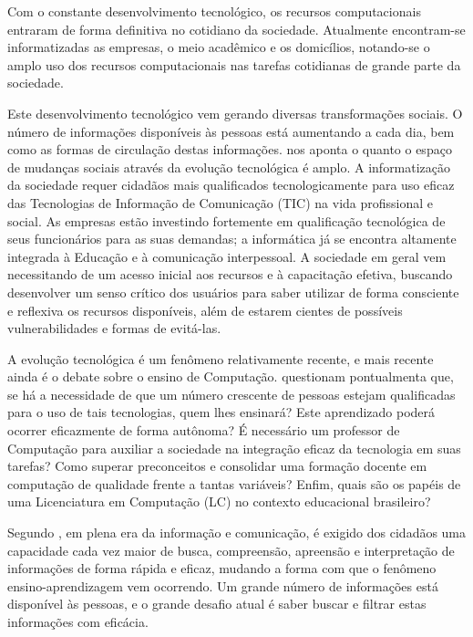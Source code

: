 

Com o constante desenvolvimento tecnológico, os recursos computacionais entraram de forma definitiva no cotidiano da sociedade. Atualmente encontram-se informatizadas as empresas, o meio acadêmico e os domicílios, notando-se o amplo uso dos recursos computacionais nas
tarefas cotidianas de grande parte da sociedade. 

Este desenvolvimento tecnológico vem gerando diversas transformações sociais. O número de informações disponíveis às pessoas está aumentando a cada dia, bem como as formas de circulação destas informações. \citep{quim2013} nos aponta o quanto o espaço de mudanças sociais através da evolução tecnológica é amplo. A informatização da sociedade requer cidadãos mais qualificados tecnologicamente para  uso eficaz das Tecnologias de Informação de Comunicação (TIC) na vida profissional e social. As empresas estão investindo fortemente em qualificação tecnológica de seus funcionários para as suas demandas; a informática já se encontra altamente integrada à Educação e à comunicação interpessoal. A sociedade em geral vem necessitando de um acesso inicial aos recursos e à capacitação efetiva, buscando desenvolver um senso crítico dos usuários para saber utilizar de forma consciente e reflexiva os recursos disponíveis, além de estarem cientes de possíveis vulnerabilidades e formas de evitá-las.


A evolução tecnológica é um fenômeno relativamente recente, e mais recente ainda é o debate sobre o ensino de Computação. \citet{castro2013a} questionam pontualmenta que, se há a necessidade de que um número crescente de pessoas estejam qualificadas para o uso de tais tecnologias, quem lhes ensinará? Este aprendizado poderá ocorrer eficazmente de forma autônoma? É necessário um professor de Computação para auxiliar a sociedade na integração eficaz da tecnologia em suas tarefas? Como superar preconceitos e consolidar uma formação docente em computação de qualidade frente a tantas variáveis? Enfim, quais são os papéis de uma Licenciatura em Computação (LC) no 
contexto educacional brasileiro?


Segundo \citet{gatti97}, em plena era da informação e comunicação, é exigido dos cidadãos uma capacidade cada vez maior de busca, compreensão, apreensão e interpretação de informações de forma rápida e eficaz, mudando a forma com que o fenômeno ensino-aprendizagem vem ocorrendo. Um grande número de informações está disponível às pessoas, e o grande desafio atual é saber buscar e filtrar estas informações com eficácia.


